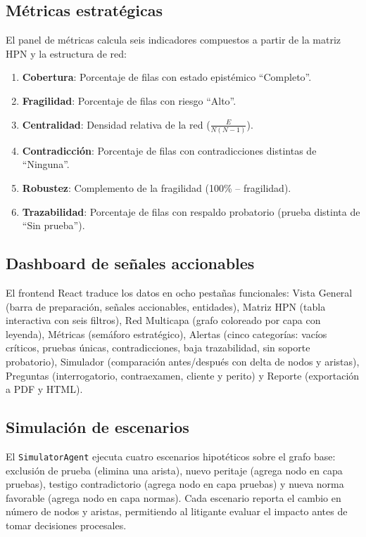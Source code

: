 \documentclass[12pt, letterpaper]{article}
\begin{document}
\subsection{Métricas estratégicas}

El panel de métricas calcula seis indicadores compuestos a partir de
la matriz HPN y la estructura de red:

\begin{enumerate}[nosep]
  \item \textbf{Cobertura}: Porcentaje de filas con estado epistémico
    ``Completo''.
  \item \textbf{Fragilidad}: Porcentaje de filas con riesgo ``Alto''.
  \item \textbf{Centralidad}: Densidad relativa de la red
    (\(\frac{E}{N(N-1)}\)).
  \item \textbf{Contradicción}: Porcentaje de filas con
    contradicciones distintas de ``Ninguna''.
  \item \textbf{Robustez}: Complemento de la fragilidad (100\% --
    fragilidad).
  \item \textbf{Trazabilidad}: Porcentaje de filas con respaldo
    probatorio (prueba distinta de ``Sin prueba'').
\end{enumerate}

\subsection{Dashboard de señales accionables}

El frontend React traduce los datos en ocho pestañas funcionales:
Vista General (barra de preparación, señales accionables, entidades),
Matriz HPN (tabla interactiva con seis filtros), Red Multicapa (grafo
coloreado por capa con leyenda), Métricas (semáforo estratégico),
Alertas (cinco categorías: vacíos críticos, pruebas únicas,
contradicciones, baja trazabilidad, sin soporte probatorio),
Simulador (comparación antes/después con delta de nodos y aristas),
Preguntas (interrogatorio, contraexamen, cliente y perito) y Reporte
(exportación a PDF y HTML).

\subsection{Simulación de escenarios}

El \texttt{SimulatorAgent} ejecuta cuatro escenarios hipotéticos
sobre el grafo base: exclusión de prueba (elimina una arista),
nuevo peritaje (agrega nodo en capa pruebas), testigo contradictorio
(agrega nodo en capa pruebas) y nueva norma favorable (agrega nodo
en capa normas). Cada escenario reporta el cambio en número de nodos
y aristas, permitiendo al litigante evaluar el impacto antes de tomar
decisiones procesales.
\end{document}
